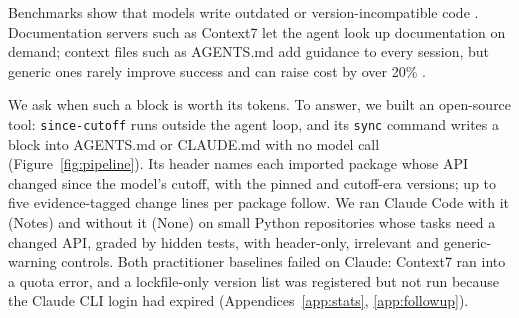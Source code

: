 \documentclass[11pt]{article}
\newcommand{\tool}{\texttt{since-cutoff}\xspace}
\newcommand{\code}[1]{\texttt{#1}}
\newcommand{\aNone}{\textsf{None}\xspace}
\newcommand{\aNotes}{\textsf{Notes}\xspace}
\begin{document}
Benchmarks show that models write outdated or version-incompatible code \citep[e.g.,][]{wang2025llmslibraryevolution,misra2026gitchameleon2,cipollone2026libevobench}.
Documentation servers such as Context7 \citep{context7} let the agent look up documentation on demand; context files such as AGENTS.md \citep{agentsmd} add guidance to every session, but generic ones rarely improve success and can raise cost by over 20\% \citep{gloaguen2026agentsmd}.

We ask when such a block is worth its tokens.
To answer, we built an open-source tool: \tool runs outside the agent loop, and its \code{sync} command writes a block into AGENTS.md or CLAUDE.md with no model call (Figure~\ref{fig:pipeline}).
Its header names each imported package whose API changed since the model's cutoff, with the pinned and cutoff-era versions; up to five evidence-tagged change lines per package follow.
We ran Claude Code with it (\aNotes) and without it (\aNone) on small Python repositories whose tasks need a changed API, graded by hidden tests, with header-only, irrelevant and generic-warning controls.
Both practitioner baselines failed on Claude: Context7 ran into a quota error, and a lockfile-only version list was registered but not run because the Claude CLI login had expired (Appendices~\ref{app:stats}, \ref{app:followup}).
\end{document}
